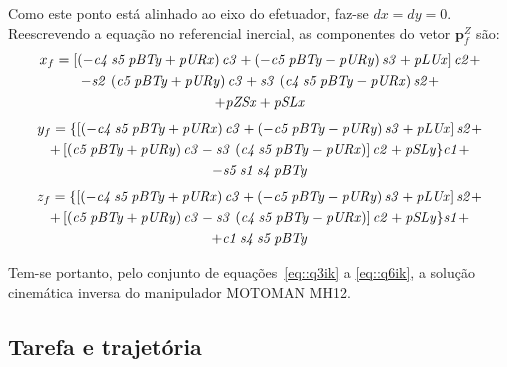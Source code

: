 Como este ponto está alinhado ao eixo do efetuador, faz-se $dx = dy = 0$.
Reescrevendo a equação no referencial inercial, as componentes do vetor
$\mathbf{p}_{f}^{Z}$ são:
%
\begin{multline}
	x_f =  \left[  \left( -{\it c4}\,{\it s5}\,{\it pBTy}+{\it pURx} \right) {
		\it c3}+ \left( -{\it c5}\,{\it pBTy}-{\it pURy} \right) {\it s3}+{
		\it pLUx} \right] {\it c2} +
		\\ -{\it s2}\, \left( {\it c5}\,{\it pBTy}+{
		\it pURy} \right) {\it c3}+{\it s3}\, \left( {\it c4}\,{\it s5}\,{\it 
		pBTy}-{\it pURx} \right) {\it s2}+
		\\ +{\it pZSx}+{\it pSLx}
\end{multline}
\vspace{-15mm}
\begin{multline}
	y_f =  \{ \left[  \left( -{\it c4}\,{\it s5}\,{\it pBTy}+{\it pURx}
 		\right) {\it c3}+ \left( -{\it c5}\,{\it pBTy}-{\it pURy} \right) {
		\it s3}+{\it pLUx} \right] {\it s2}+ 
		\\ + \left[  \left( {\it c5}\,{\it 
		pBTy}+{\it pURy} \right) {\it c3}-{\it s3}\, \left( {\it c4}\,{\it s5}
		\,{\it pBTy}-{\it pURx} \right)  \right] {\it c2}+{\it pSLy} \} {
		\it c1} +
		\\ -{\it s5}\,{\it s1}\,{\it s4}\,{\it pBTy}
\end{multline}
\vspace{-15mm}
\begin{multline}
	z_f =  \{  \left[ \left( -{\it c4}\,{\it s5}\,{\it pBTy}+{\it pURx}
 		\right) {\it c3}+ \left( -{\it c5}\,{\it pBTy}-{\it pURy} \right) {
		\it s3}+{\it pLUx} \right] {\it s2}+ 
		\\ + \left[ \left( {\it c5}\,{\it 
		pBTy}+{\it pURy} \right) {\it c3}-{\it s3}\, \left( {\it c4}\,{\it s5}
		\,{\it pBTy}-{\it pURx} \right)  \right] {\it c2}+{\it pSLy} \} {
		\it s1} +
		\\ +{\it c1}\,{\it s4}\,{\it s5}\,{\it pBTy}
\end{multline}


Tem-se portanto, pelo conjunto de equações~\ref{eq::q3ik} a \ref{eq::q6ik}, a
solução cinemática inversa do manipulador MOTOMAN MH12.


\subsection{Tarefa e trajetória}



